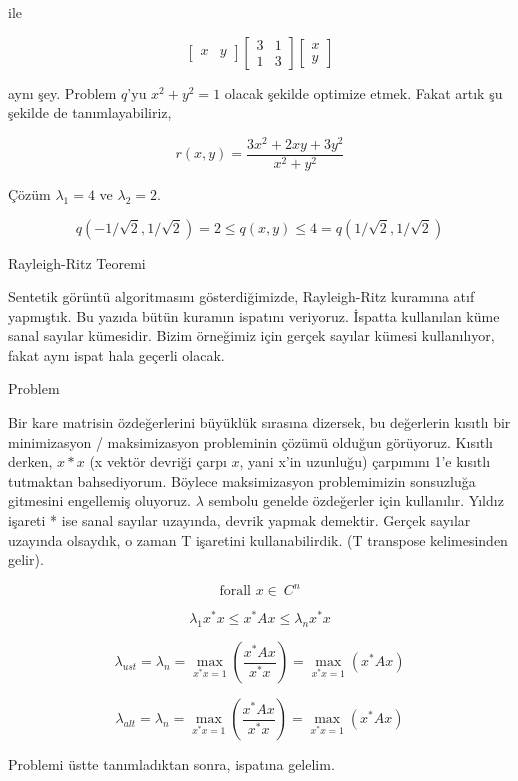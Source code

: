 \documentclass[12pt,fleqn]{article}\usepackage{../../common}
\begin{document}
ile

$$
\left[\begin{array}{cc} x & y \end{array}\right]
\left[\begin{array}{rrr}3 & 1 \\ 1 & 3 \end{array}\right]
\left[\begin{array}{c} x \\ y \end{array}\right]
$$

aynı şey. Problem $q$'yu $x^2+y^2 = 1$ olacak şekilde optimize etmek. Fakat
artık şu şekilde de tanımlayabiliriz,

$$
r(x,y) = \frac{ 3x^2 + 2xy + 3y^2}{x^2+y^2 }
$$

Çözüm $\lambda_1=4$ ve $\lambda_2 = 2$.

$$
q(-1/\sqrt{2},1/\sqrt{2}) =
2 \le q(x,y) \le 4 =
q(1/\sqrt{2},1/\sqrt{2})
$$


Rayleigh-Ritz Teoremi

Sentetik görüntü algoritmasını gösterdiğimizde, Rayleigh-Ritz kuramına atıf
yapmıştık. Bu yazıda bütün kuramın ispatını veriyoruz. İspatta kullanılan
küme sanal sayılar kümesidir. Bizim örneğimiz için gerçek sayılar kümesi
kullanılıyor, fakat aynı ispat hala geçerli olacak.

Problem

Bir kare matrisin özdeğerlerini büyüklük sırasına dizersek, bu değerlerin
kısıtlı bir minimizasyon / maksimizasyon probleminin çözümü olduğun
görüyoruz. Kısıtlı derken, $x*x$ (x vektör devriği çarpı $x$, yani x'in
uzunluğu) çarpımını 1'e kısıtlı tutmaktan bahsediyorum. Böylece
maksimizasyon problemimizin sonsuzluğa gitmesini engellemiş
oluyoruz. $\lambda$ sembolu genelde özdeğerler için kullanılır. Yıldız
işareti * ise sanal sayılar uzayında, devrik yapmak demektir. Gerçek
sayılar uzayında olsaydık, o zaman T işaretini kullanabilirdik. (T
transpose kelimesinden gelir).

$$ \textrm{forall } x \in \ C^n  $$

$$ \lambda_1x^*x \le x^*Ax \le \lambda_nx^*x  $$

$$ 
\lambda_{ust} = \lambda_n = 
\max\limits_{x^*x=1} (\frac{x^*Ax}{x^*x}) =
\max\limits_{x^*x=1}(x^*Ax)
 $$

$$ 
\lambda_{alt} = \lambda_n = 
\max\limits_{x^*x=1} (\frac{x^*Ax}{x^*x}) =
\max\limits_{x^*x=1}(x^*Ax)
$$

Problemi üstte tanımladıktan sonra, ispatına gelelim. 
\end{document}
